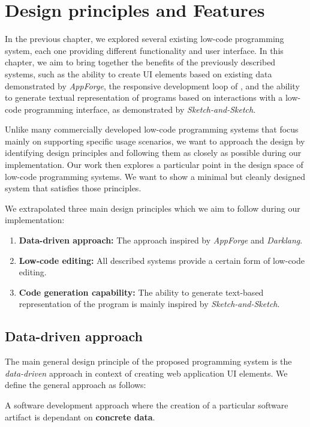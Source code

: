 \chapter{Design principles and Features}
\label{chap:design}

In the previous chapter, we explored several existing low-code programming system, each one providing different functionality and user interface.
In this chapter, we aim to bring together the benefits of the previously described systems,
such as the ability to create UI elements based on existing data demonstrated by \emph{AppForge}\cite{Yang_Gupta_Botev_Churchill_Levchenko_Shanmugasundaram_2008},
the responsive development loop of \citet{darklang}, and the ability to generate textual representation of programs based on
interactions with a low-code programming interface, as demonstrated by \emph{Sketch-and-Sketch}\cite{sketch-and-sketch}.

Unlike many commercially developed low-code programming systems that focus mainly on supporting specific usage scenarios,
we want to approach the design by identifying design principles and following them as closely as possible during our implementation.
Our work then explores a particular point in the design space of low-code programming systems.
We want to show a minimal but cleanly designed system that satisfies those principles.

We extrapolated three main design principles which we aim to follow during our implementation:
\begin{enumerate}
	\item \textbf{Data-driven approach:} The approach inspired by \emph{AppForge} and \emph{Darklang}.
	\item \textbf{Low-code editing:}  All described systems provide a certain form of low-code editing.
	\item \textbf{Code generation capability:} The ability to generate text-based representation of the program is mainly inspired by \emph{Sketch-and-Sketch}.
\end{enumerate}

\section{Data-driven approach}

The main general design principle of the proposed programming system is the \emph{data-driven} approach in context of creating web application UI elements.
We define the general approach as follows:
\begin{defn}
	A software development approach where the creation of a particular software artifact is dependant on \textbf{concrete data}.
\end{defn}

